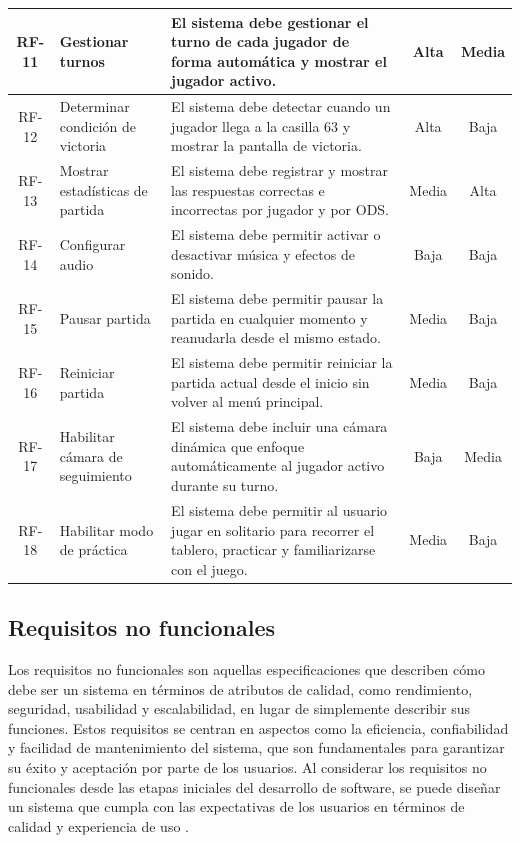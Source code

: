 \begin{longtable}{|c|p{}|p{}|c|c|}
\hline
RF-11 & Gestionar turnos & El sistema debe gestionar el turno de cada jugador de forma automática y mostrar el jugador activo. & Alta & Media \\
\hline
RF-12 & Determinar condición de victoria & El sistema debe detectar cuando un jugador llega a la casilla 63 y mostrar la pantalla de victoria. & Alta & Baja \\
\hline
RF-13 & Mostrar estadísticas de partida & El sistema debe registrar y mostrar las respuestas correctas e incorrectas por jugador y por ODS. & Media & Alta \\
\hline
RF-14 & Configurar audio & El sistema debe permitir activar o desactivar música y efectos de sonido. & Baja & Baja \\
\hline
RF-15 & Pausar partida & El sistema debe permitir pausar la partida en cualquier momento y reanudarla desde el mismo estado. & Media & Baja \\
\hline
RF-16 & Reiniciar partida & El sistema debe permitir reiniciar la partida actual desde el inicio sin volver al menú principal. & Media & Baja \\
\hline
RF-17 & Habilitar cámara de seguimiento & El sistema debe incluir una cámara dinámica que enfoque automáticamente al jugador activo durante su turno. & Baja & Media \\
\hline
RF-18 & Habilitar modo de práctica & El sistema debe permitir al usuario jugar en solitario para recorrer el tablero, practicar y familiarizarse con el juego. & Media & Baja \\
\hline
\hline
\end{longtable}

\subsection{Requisitos no funcionales}
\label{subsec:req_no_funcionales}

Los requisitos no funcionales son aquellas especificaciones que describen cómo debe ser un sistema en términos de atributos de calidad, como rendimiento, seguridad, usabilidad y escalabilidad, en lugar de simplemente describir sus funciones. Estos requisitos se centran en aspectos como la eficiencia, confiabilidad y facilidad de mantenimiento del sistema, que son fundamentales para garantizar su éxito y aceptación por parte de los usuarios. Al considerar los requisitos no funcionales desde las etapas iniciales del desarrollo de software, se puede diseñar un sistema que cumpla con las expectativas de los usuarios en términos de calidad y experiencia de uso \parencite{Pressman2019}.

